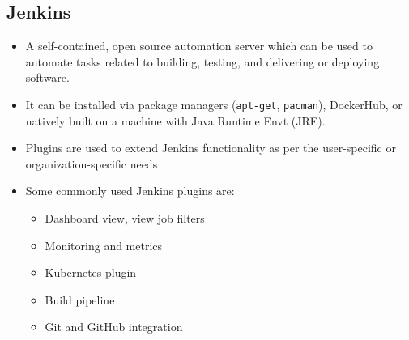 \documentclass{article}
\begin{document}
\subsection{Jenkins}
\begin{itemize}
    \item A self-contained, open source automation server which can be used to automate tasks related to building, testing, and delivering or deploying software.
    
    \item It can be installed via package managers (\texttt{apt-get}, \texttt{pacman}), DockerHub, or natively built on a machine with Java Runtime Envt (JRE). 
    
    \item Plugins are used to extend Jenkins functionality as per the user-specific or organization-specific needs
    
    \item Some commonly used Jenkins plugins are:
    \begin{itemize}
        \item Dashboard view, view job filters
        
        \item Monitoring and metrics 
        
        \item Kubernetes plugin
        
        \item Build pipeline
        
        \item Git and GitHub integration 
    \end{itemize}
\end{itemize}
\end{document}
